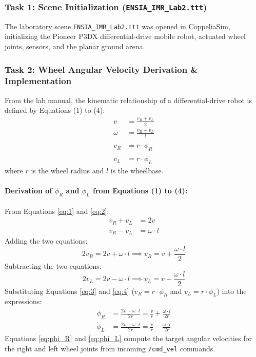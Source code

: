 \documentclass[11pt,a4paper]{article}
\begin{document}
\subsubsection*{Task 1: Scene Initialization (\texttt{ENSIA\_IMR\_Lab2.ttt})}
The laboratory scene \texttt{ENSIA\_IMR\_Lab2.ttt} was opened in CoppeliaSim, initializing the Pioneer P3DX differential-drive mobile robot, actuated wheel joints, sensors, and the planar ground arena.

\subsubsection*{Task 2: Wheel Angular Velocity Derivation \& Implementation}
From the lab manual, the kinematic relationship of a differential-drive robot is defined by Equations (1) to (4):
\begin{align}
  v &= \frac{v_R + v_L}{2} \label{eq:1} \\
  \omega &= \frac{v_R - v_L}{l} \label{eq:2} \\
  v_R &= r \cdot \dot{\phi}_R \label{eq:3} \\
  v_L &= r \cdot \dot{\phi}_L \label{eq:4}
\end{align}
where $r$ is the wheel radius and $l$ is the wheelbase.

\paragraph{Derivation of $\dot{\phi}_R$ and $\dot{\phi}_L$ from Equations (1) to (4):}
From Equations \eqref{eq:1} and \eqref{eq:2}:
\begin{align*}
  v_R + v_L &= 2v \\
  v_R - v_L &= \omega \cdot l
\end{align*}
Adding the two equations:
\[
  2v_R = 2v + \omega \cdot l \implies v_R = v + \frac{\omega \cdot l}{2}
\]
Subtracting the two equations:
\[
  2v_L = 2v - \omega \cdot l \implies v_L = v - \frac{\omega \cdot l}{2}
\]
Substituting Equations \eqref{eq:3} and \eqref{eq:4} ($v_R = r \cdot \dot{\phi}_R$ and $v_L = r \cdot \dot{\phi}_L$) into the expressions:
\begin{align}
  \dot{\phi}_R &= \frac{2v + \omega \cdot l}{2r} = \frac{v}{r} + \frac{\omega \cdot l}{2r} \label{eq:phi_R} \\[4pt]
  \dot{\phi}_L &= \frac{2v - \omega \cdot l}{2r} = \frac{v}{r} - \frac{\omega \cdot l}{2r} \label{eq:phi_L}
\end{align}
Equations \eqref{eq:phi_R} and \eqref{eq:phi_L} compute the target angular velocities for the right and left wheel joints from incoming \texttt{/cmd\_vel} commands.
\end{document}
